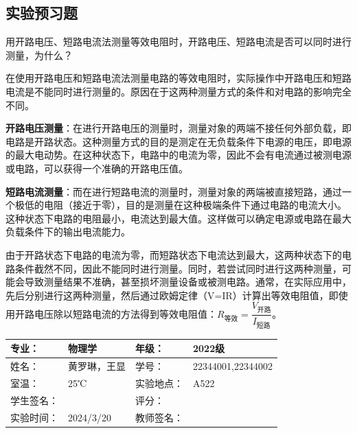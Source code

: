 \documentclass[dvipsnames, svgnames,a4paper,11pt]{article}
\begin{document}
	
	
	\subsection{实验预习题}
	
\begin{question}
	用开路电压、短路电流法测量等效电阻时，开路电压、短路电流是否可以同时进行测量，为什么？
\end{question}

在使用开路电压和短路电流法测量电路的等效电阻时，实际操作中开路电压和短路电流是不能同时进行测量的。原因在于这两种测量方式的条件和对电路的影响完全不同。

\textbf{开路电压测量}：在进行开路电压的测量时，测量对象的两端不接任何外部负载，即电路是开路状态。这种测量方式的目的是测定在无负载条件下电源的电压，即电源的最大电动势。在这种状态下，电路中的电流为零，因此不会有电流通过被测电源或电路，可以获得一个准确的开路电压值。

\textbf{短路电流测量}：而在进行短路电流的测量时，测量对象的两端被直接短路，通过一个极低的电阻（接近于零），目的是测量在这种极端条件下通过电路的电流大小。这种状态下电路的电阻最小，电流达到最大值。这样做可以确定电源或电路在最大负载条件下的输出电流能力。

由于开路状态下电路的电流为零，而短路状态下电流达到最大，这两种状态下的电路条件截然不同，因此不能同时进行测量。同时，若尝试同时进行这两种测量，可能会导致测量结果不准确，甚至损坏测量设备或被测电路。通常，在实际应用中，先后分别进行这两种测量，然后通过欧姆定律（V=IR）计算出等效电阻值，即使用开路电压除以短路电流的方法得到等效电阻值：$ R_{\text{等效}} = \dfrac{V_{\text{开路}}}{I_{\text{短路}}} $。
	
	
	\clearpage
	
	\begin{table}
		\renewcommand\arraystretch{1.7}
		\centering
		\begin{tabularx}{\textwidth}{|X|X|X|X|}
			\hline
			专业： & 物理学 & 年级： & 2022级 \\
			\hline
			姓名： & 黄罗琳，王显& 学号： &22344001,22344002 \\
			\hline
			室温： &  25℃& 实验地点： & A522 \\
			\hline
			学生签名：&  & 评分： &\\
			\hline
			实验时间：& 2024/3/20 & 教师签名：&\\
			\hline
		\end{tabularx}
	\end{table}
	
\end{document}
